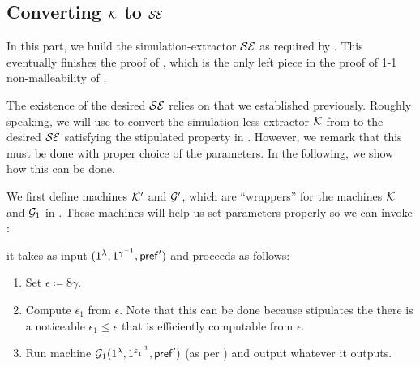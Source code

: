 
\subsection{Converting $\mathcal{K}$ to \textnormal{$\mathcal{SE}$}}
\label{sec:sim-less-to-sim:1-1}

In this part, we build the simulation-extractor $\mathcal{SE}$ as required by . This eventually finishes the proof of , which is the only left piece in the proof of 1-1 non-malleability of . 


The existence of the desired $\mathcal{SE}$ relies on  that we established previously. Roughly speaking, we will use  to convert the simulation-less extractor $\mathcal{K}$ from  to the desired $\mathcal{SE}$ satisfying the stipulated property in . However, we remark that this must be done with proper choice of the parameters. In the following, we show how this can be done.

We first define machines $\mathcal{K}'$ and $\mathcal{G}'$, which are ``wrappers'' for the machines $\mathcal{K}$ and $\mathcal{G}_1$ in . These machines will help us set parameters properly so we can invoke :

 it takes as input $(1^\lambda, 1^{\gamma^{-1}}, \mathsf{pref}')$ and proceeds as follows:
\begin{enumerate}
\item
Set $\epsilon\coloneqq 8\gamma$.
\item
Compute $\epsilon_1$ from $\epsilon$. Note that this can be done because  stipulates the there is a noticeable $\epsilon_1 \le \epsilon$ that is efficiently computable from $\epsilon$.
\item
Run machine $\mathcal{G}_1(1^\lambda, 1^{\varepsilon_1^{-1}}, \mathsf{pref}')$ (as per ) and output whatever it outputs.
\end{enumerate}

